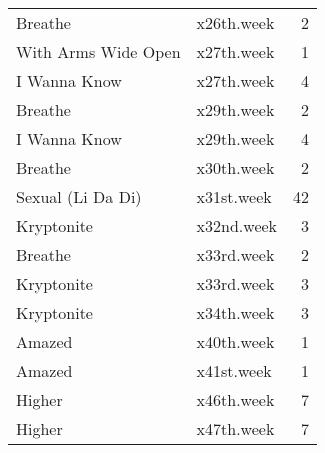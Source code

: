 \begin{table}[ht]
\begin{tabular}{llr}
  Breathe & x26th.week &   2 \\ 
  With Arms Wide Open & x27th.week &   1 \\ 
  I Wanna Know & x27th.week &   4 \\ 
  Breathe & x29th.week &   2 \\ 
  I Wanna Know & x29th.week &   4 \\ 
  Breathe & x30th.week &   2 \\ 
  Sexual (Li Da Di) & x31st.week &  42 \\ 
  Kryptonite & x32nd.week &   3 \\ 
  Breathe & x33rd.week &   2 \\ 
  Kryptonite & x33rd.week &   3 \\ 
  Kryptonite & x34th.week &   3 \\ 
  Amazed & x40th.week &   1 \\ 
  Amazed & x41st.week &   1 \\ 
  Higher & x46th.week &   7 \\ 
  Higher & x47th.week &   7 \\ 
   \hline
\end{tabular}
\end{table}
